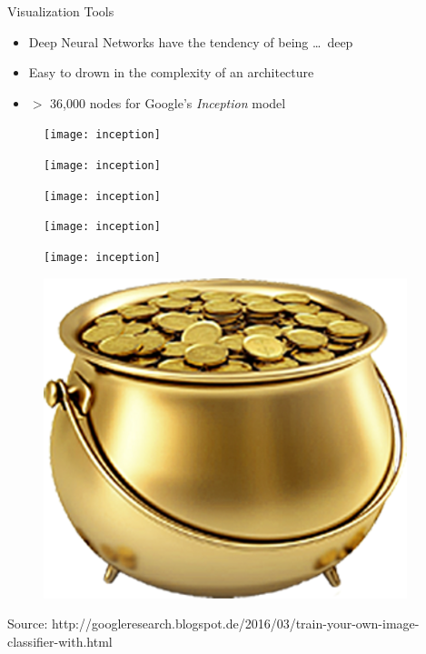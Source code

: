 \begin{slide}{Visualization Tools}
  \begin{itemize}
    \item Deep Neural Networks have the tendency of being \dots\, deep
    \item Easy to drown in the complexity of an architecture
    \item $>$ 36,000 nodes for Google's \emph{Inception} model
  \end{itemize}
  \begin{figure}
    \texttt{[image: inception]}
  \end{figure}
\end{slide}

\begin{frame}
  \begin{figure}
     \advance\leftskip-2.2cm
    \texttt{[image: inception]}
  \end{figure}
\end{frame}

\begin{frame}
  \begin{figure}
    \advance\leftskip-2.2cm
    \texttt{[image: inception]}
  \end{figure}
\end{frame}

\begin{frame}
  \begin{figure}
    \advance\leftskip-2.2cm
    \texttt{[image: inception]}
  \end{figure}
\end{frame}

\begin{frame}
  \begin{figure}
    \advance\leftskip-2.2cm
    \texttt{[image: inception]}

    \hspace{3cm}\includegraphics[scale=0.15]{gold}
    \vfill
  \end{figure}
  {\tiny Source: http://googleresearch.blogspot.de/2016/03/train-your-own-image-classifier-with.html}
\end{frame}


